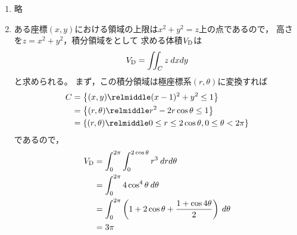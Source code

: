 \begin{ans*}
  ${}$
  \begin{enumerate}[label=(\arabic*)]
    \item 略 %
    \item ある座標$(x,y)$における領域の上限は$x^2+y^2=z$上の点であるので，
    高さを$z=x^2 + y^2$，積分領域をとして
    求める体積$V_{\rm{D}}$は
    \begin{gather}
      V_{\rm{D}} = \iint_C z \:dxdy
    \end{gather}
    と求められる。
    まず，この積分領域は極座標系$(r,\theta)$に変換すれば
    \begin{align}
      C 
      &= \left\{(x,y)\relmiddle (x-1)^2 + y^2 \leq 1 \right\} \\
      &= \left\{(r,\theta)\relmiddle r^2 - 2r\cos\theta\leq 1 \right\} \\
      &= \left\{(r,\theta)\relmiddle 0\leq r\leq 2\cos\theta, 0\leq \theta < 2\pi \right\}
    \end{align}
    であるので，
    \begin{align}
      V_{\rm{D}}
      &= \int_{0}^{2\pi}\int_{0}^{2\cos\theta}r^3\:drd\theta \\
      &= \int_{0}^{2\pi} 4\cos^4\theta\:d\theta \\
      &= \int_{0}^{2\pi} \left(1 + 2\cos\theta + \frac{1 + \cos4\theta}{2}\right)\:d\theta \\
      &= 3\pi
    \end{align}
  \end{enumerate}
  
\end{ans*}

